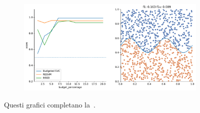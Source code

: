 \begin{appendices}
\begin{figure}
\begin{subfigure}{.5\textwidth}
    \end{subfigure}%
    \hfill
    \begin{subfigure}{.5\textwidth}
        \centering
        \includegraphics[width=\textwidth]{img/comp_new/11.pdf}
    \end{subfigure}
\caption{Questi grafici completano la~.}
\end{figure}


\end{appendices}